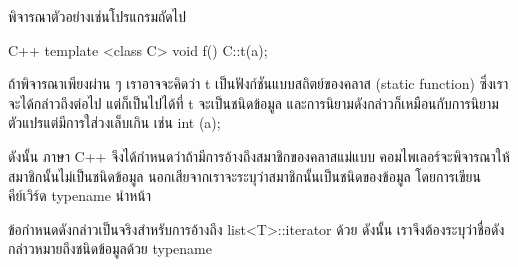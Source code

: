 พิจารณา{\wbr}ตัวอย่าง{\wbr}เช่น{\wbr}โปรแกรม{\wbr}ถัด{\wbr}ไป{\wbr}

\latintext
\begin{codelist}{C++}{}
template <class C> void f()
{
  C::t(a);
}
\end{codelist}
\thaitext

ถ้า{\wbr}พิจารณา{\wbr}เพียง{\wbr}ผ่าน ๆ เรา{\wbr}อาจ{\wbr}จะ{\wbr}คิด{\wbr}ว่า {\ct t} เป็น{\wbr}ฟังก์ชัน{\wbr}แบบ{\wbr}สถิตย์{\wbr}ของ{\wbr}ค{\wbr}ลา{\wbr}ส (static
function) ซึ่ง{\wbr}เรา{\wbr}จะ{\wbr}ได้{\wbr}กล่าว{\wbr}ถึง{\wbr}ต่อไป แต่{\wbr}ก็{\wbr}เป็น{\wbr}ไป{\wbr}ได้{\wbr}ที่ {\ct t} จะ{\wbr}เป็น{\wbr}ชนิด{\wbr}ข้อมูล{\wbr}
และ{\wbr}การ{\wbr}นิยาม{\wbr}ดังกล่าว{\wbr}ก็{\wbr}เหมือน{\wbr}กับ{\wbr}การ{\wbr}นิยาม{\wbr}ตัวแปร{\wbr}แต่{\wbr}มี{\wbr}การ{\wbr}ใส่{\wbr}วงเล็บ{\wbr}เกิน เช่น {\ct int (a);}

ดังนั้น ภาษา C++ จึง{\wbr}ได้{\wbr}กำหนด{\wbr}ว่า{\wbr}ถ้า{\wbr}มี{\wbr}การ{\wbr}อ้าง{\wbr}ถึง{\wbr}สมาชิก{\wbr}ของ{\wbr}ค{\wbr}ลา{\wbr}ส{\wbr}แม่แบบ{\wbr}
คอม{\wbr}ไพ{\wbr}เลอร์{\wbr}จะ{\wbr}พิจารณา{\wbr}ให้{\wbr}สมาชิก{\wbr}นั้น{\wbr}ไม่{\wbr}เป็น{\wbr}ชนิด{\wbr}ข้อมูล{\wbr}
นอก{\wbr}เสีย{\wbr}จาก{\wbr}เรา{\wbr}จะ{\wbr}ระบุ{\wbr}ว่า{\wbr}สมาชิก{\wbr}นั้น{\wbr}เป็น{\wbr}ชนิด{\wbr}ของ{\wbr}ข้อมูล โดย{\wbr}การ{\wbr}เขียน{\wbr}คีย์{\wbr}เวิร์ด {\ct
  typename} นำหน้า{\wbr}

ข้อกำหนด{\wbr}ดังกล่าว{\wbr}เป็นจริง{\wbr}สำหรับ{\wbr}การ{\wbr}อ้าง{\wbr}ถึง {\ct list<T>::iterator} ด้วย ดังนั้น{\wbr}
เรา{\wbr}จึง{\wbr}ต้อง{\wbr}ระบุ{\wbr}ว่า{\wbr}ชื่อดัง{\wbr}กล่าว{\wbr}หมายถึง{\wbr}ชนิด{\wbr}ข้อมูล{\wbr}ด้วย {\ct typename}


